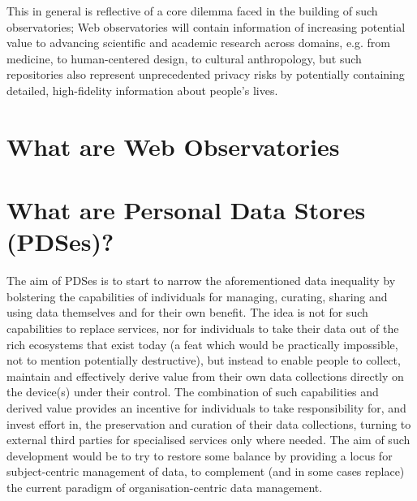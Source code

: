 \documentclass{acm_proc_article-sp}
\begin{document}
This in general is reflective of a core dilemma faced in the building of such
observatories; Web observatories will contain information
of increasing potential value to advancing scientific and academic research across
domains, e.g. from medicine, to human-centered design, to cultural anthropology, 
but such repositories also represent unprecedented privacy risks by potentially
containing detailed, high-fidelity information about people's lives. 




\section{What are Web Observatories}



\section{What are Personal Data Stores (PDSes)?}

The aim of PDSes is to start to narrow the aforementioned data inequality by bolstering the capabilities of individuals for managing, curating, sharing and using data themselves and for their own benefit.  The idea is not for such capabilities to replace services, nor for individuals to take their data out of the rich ecosystems that exist today (a feat which would be practically impossible, not to mention potentially destructive), but instead to enable people to collect, maintain and effectively derive value from their own data collections directly on the device(s) under their control.  The combination of such capabilities and derived value provides an incentive for individuals to take responsibility for, and invest effort in, the preservation and curation of their data collections, turning to external third parties for specialised services only where needed.  The aim of such development would be to try to restore some balance by providing a locus for subject-centric management of data, to complement (and in some cases replace) the current paradigm of organisation-centric data management.
\end{document}
